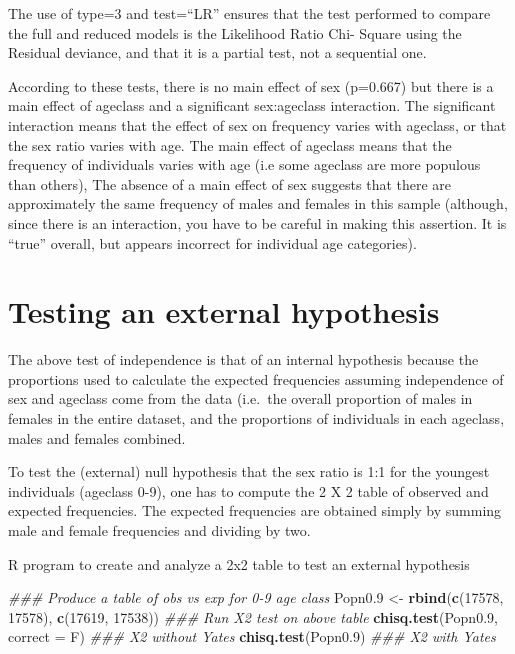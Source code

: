 \documentclass[
  12pt,
]{book}
\newenvironment{Shaded}{\begin{snugshade}}{\end{snugshade}}
\newcommand{\CommentTok}[1]{\textcolor[rgb]{0.56,0.35,0.01}{\textit{#1}}}
\newcommand{\DataTypeTok}[1]{\textcolor[rgb]{0.13,0.29,0.53}{#1}}
\newcommand{\DecValTok}[1]{\textcolor[rgb]{0.00,0.00,0.81}{#1}}
\newcommand{\FloatTok}[1]{\textcolor[rgb]{0.00,0.00,0.81}{#1}}
\newcommand{\KeywordTok}[1]{\textcolor[rgb]{0.13,0.29,0.53}{\textbf{#1}}}
\newcommand{\NormalTok}[1]{#1}
\newcommand{\StringTok}[1]{\textcolor[rgb]{0.31,0.60,0.02}{#1}}
\begin{document}
The use of type=3 and test=``LR'' ensures that the test performed to compare the full and reduced models is the Likelihood Ratio Chi- Square using the Residual deviance, and that it is a partial test, not a sequential one.

According to these tests, there is no main effect of sex (p=0.667) but there is a main effect of ageclass and a significant sex:ageclass interaction. The significant interaction means that the effect of sex on frequency varies with ageclass, or that the sex ratio varies with age. The main effect of ageclass means that the frequency of individuals varies with age (i.e some ageclass are more populous than others), The absence of a main effect of sex suggests that there are approximately the same frequency of males and females in this sample (although, since there is an interaction, you have to be careful in making this assertion. It is ``true'' overall, but appears incorrect for individual age categories).

\hypertarget{testing-an-external-hypothesis}{%
\section{Testing an external hypothesis}\label{testing-an-external-hypothesis}}

The above test of independence is that of an internal hypothesis because the proportions used to calculate the expected frequencies assuming independence of sex and ageclass come from the data (i.e.~the overall proportion of males in females in the entire dataset, and the proportions of individuals in each ageclass, males and females combined.

To test the (external) null hypothesis that the sex ratio is 1:1 for the youngest individuals (ageclass 0-9), one has to compute the 2 X 2 table of observed and expected frequencies. The expected frequencies are obtained simply by summing male and female frequencies and dividing by two.

R program to create and analyze a 2x2 table to test an
external hypothesis

\begin{Shaded}
\begin{Highlighting}[]
\CommentTok{\#\#\# Produce a table of obs vs exp for 0{-}9 age class}
\NormalTok{Popn0}\FloatTok{.9}\NormalTok{ \textless{}{-}}\StringTok{ }\KeywordTok{rbind}\NormalTok{(}\KeywordTok{c}\NormalTok{(}\DecValTok{17578}\NormalTok{, }\DecValTok{17578}\NormalTok{), }\KeywordTok{c}\NormalTok{(}\DecValTok{17619}\NormalTok{, }\DecValTok{17538}\NormalTok{))}
\CommentTok{\#\#\# Run X2 test on above table}
\KeywordTok{chisq.test}\NormalTok{(Popn0}\FloatTok{.9}\NormalTok{, }\DataTypeTok{correct =}\NormalTok{ F) }\CommentTok{\#\#\# X2 without Yates}
\KeywordTok{chisq.test}\NormalTok{(Popn0}\FloatTok{.9}\NormalTok{) }\CommentTok{\#\#\# X2 with Yates}
\end{Highlighting}
\end{Shaded}
\end{document}
